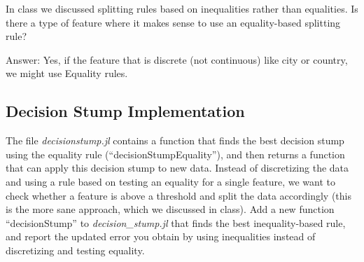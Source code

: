 \documentclass{article}
\def\ans#1{\par\gre{Answer: #1}}
\def\blu#1{{\color{blu}#1}}
\def\gre#1{{\color{gre}#1}}
\begin{document}
In class we discussed splitting rules based on inequalities rather than equalities. \blu{Is there a type of feature where it makes sense to use 
an equality-based splitting rule?}
\ans{Yes, if the feature that is discrete (not continuous) like city or country, we might use Equality rules.}



\subsection{Decision Stump Implementation}

The file \emph{decisionstump.jl} contains a function  that finds the best decision stump using the equality rule (``decisionStumpEquality''), and then returns a function that can apply this decision stump to new data. Instead of discretizing the data and using a rule based on testing an equality for a single feature, we want to check whether a feature is above a threshold and split the data accordingly (this is the more sane approach, which we discussed in class). \blu{Add a new function ``decisionStump'' to \emph{decision\_stump.jl} that finds the best inequality-based rule, and report the updated error you obtain by using inequalities instead of discretizing and testing equality.}
\end{document}
